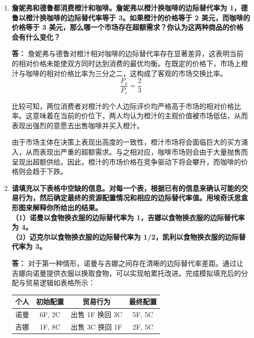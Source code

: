 \begin{enumerate}[label=\textbf{\arabic*.}, leftmargin=*]
\begin{center}
		\end{center}
		
		\item \textbf{詹妮弗和德鲁都消费橙汁和咖啡。詹妮弗以橙汁换咖啡的边际替代率为 1，德鲁以橙汁换咖啡的边际替代率等于 3。如果橙汁的价格等于 2 美元，而咖啡的价格等于 3 美元，那么哪一个市场存在超额需求？你认为这两种商品的价格会有什么变化？}
		
		\textbf{答：}
		詹妮弗与德鲁对橙汁相对咖啡的边际替代率存在显著差异，这表明当前的相对价格未能使双方同时达到消费的最优均衡。在既定的价格下，市场上橙汁与咖啡的相对价格比率为三分之二，这构成了客观的市场交换比率。
		\[
		\frac{P_o}{P_c} = \frac{2}{3}
		\]
		
		比较可知，两位消费者对橙汁的个人边际评价均严格高于市场的相对价格比率。这意味着在当前的价位下，两人均认为橙汁的主观价值被市场低估，从而表现出强烈的意愿去出售咖啡并买入橙汁。
		
		由于市场主体在决策上表现出高度的一致性，橙汁市场将会面临巨大的买方涌入，从而表现出严重的超额需求。与之相对应，咖啡市场则会由于大量抛售而呈现出超额供给。因此，橙汁的市场价格在竞争驱动下将会攀升，而咖啡的价格则会趋于下跌。
		
		\item \textbf{请填充以下表格中空缺的信息。对每一个表，根据已有的信息来确认可能的交易行为，然后确定最终的资源配置情况和相应的边际替代率值。用埃奇沃思盒形图来解释你所给出的结果。\\（1）诺曼以食物换衣服的边际替代率为 1，吉娜以食物换衣服的边际替代率为 4。\\（2）迈克尔以食物换衣服的边际替代率为 1/2，凯利以食物换衣服的边际替代率为 3。}
		
		\textbf{答：}
		对于第一种情形，诺曼与吉娜之间存在清晰的边际替代率差距。通过让吉娜向诺曼提供衣服以换取食物，可以实现帕累托改进。完成模拟填充后的分配与贸易逻辑如表格所示：
		\begin{center}
			\small
			\renewcommand{\arraystretch}{1.2}
			\setlength{\tabcolsep}{6pt}
			\begin{tabular}{cccc}
				\hline
				个人 & 初始配置 & 贸易行为 & 最终配置 \\ \hline
				诺曼 & 6F, 2C & 出售 1F 换回 3C & 5F, 5C \\
				吉娜 & 1F, 8C & 出售 3C 换回 1F & 2F, 5C \\ \hline
			\end{tabular}
		\end{center}
		

\end{enumerate}

